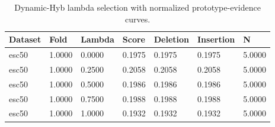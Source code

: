 \begin{table}[htbp]
\centering
\caption{Dynamic-Hyb lambda selection with normalized prototype-evidence curves.}
\label{tab:dynamic-fpde-lambda}
\begin{tabular}{lllllll}
\toprule
Dataset & Fold & Lambda & Score & Deletion & Insertion & N \\
\midrule
esc50 & 1.0000 & 0.0000 & 0.1975 & 0.1975 & 0.1975 & 5.0000 \\
esc50 & 1.0000 & 0.2500 & 0.2058 & 0.2058 & 0.2058 & 5.0000 \\
esc50 & 1.0000 & 0.5000 & 0.1986 & 0.1986 & 0.1986 & 5.0000 \\
esc50 & 1.0000 & 0.7500 & 0.1988 & 0.1988 & 0.1988 & 5.0000 \\
esc50 & 1.0000 & 1.0000 & 0.1932 & 0.1932 & 0.1932 & 5.0000 \\
\bottomrule
\end{tabular}
\end{table}

